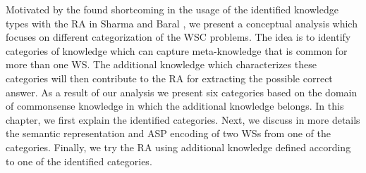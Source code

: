 


Motivated by the found shortcoming in the usage of the identified knowledge types with the RA in Sharma and Baral \cite{2018CommonsenseKT}, we present a conceptual analysis which focuses on different categorization of the WSC problems. The idea is to identify categories of knowledge which can capture meta-knowledge that is common for more than one WS. The additional knowledge which characterizes these categories will then contribute to the RA for extracting the possible correct answer. As a result of our analysis we present six categories based on the domain of commonsense knowledge in which the additional knowledge belongs. In this chapter, we first explain the identified categories. Next, we discuss in more details the semantic representation and ASP encoding of two WSs from one of the categories. Finally, we try the RA using additional knowledge defined according to one of the identified categories. 
  
\begin{comment}
Similarly as in Sharma et al. \cite{DBLP:conf/ijcai/SharmaVAB15} and in Sharma and Baral \cite{2018CommonsenseKT}, we identify categories of knowledge which are needed in order to answer the questions from the WSs. 
The identified categories are based on the domains of commonsense knowledge from which the required knowledge is.  
We identified six categories with which all problems from the WSC corpus were categorized.
We use the KParser for extracting the semantic graph representation of the sentence. Next we are interested into identifying the relevant knowledge which is needed for resolving the ambiguous pronoun. 
We use the KParser for extracting the graph representation of the input sentence and question. Furthermore, we use the Reasoning Algorithm given in \cite{2018CommonsenseKT} for finding the correct answer with some small modification which will be explained later.
\end{comment}


